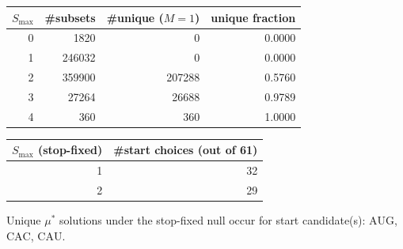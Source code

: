 \begin{center}
\small
\setlength{\tabcolsep}{6pt}
\renewcommand{\arraystretch}{1.15}
\begin{tabular}{rrrr}
\toprule
$S_{\max}$ & \#subsets & \#unique ($M=1$) & unique fraction \\
\midrule
0 & 1820 & 0 & 0.0000 \\
1 & 246032 & 0 & 0.0000 \\
2 & 359900 & 207288 & 0.5760 \\
3 & 27264 & 26688 & 0.9789 \\
4 & 360 & 360 & 1.0000 \\
\bottomrule
\end{tabular}
\end{center}

\begin{center}
\small
\setlength{\tabcolsep}{6pt}
\renewcommand{\arraystretch}{1.15}
\begin{tabular}{rr}
\toprule
$S_{\max}$ (stop-fixed) & \#start choices (out of 61) \\
\midrule
1 & 32 \\
2 & 29 \\
\bottomrule
\end{tabular}
\end{center}

Unique $\mu^\ast$ solutions under the stop-fixed null occur for start candidate(s): $\mathrm{AUG}$, $\mathrm{CAC}$, $\mathrm{CAU}$.
